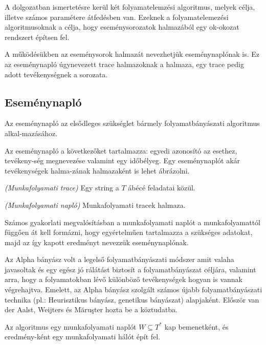 

A dolgozatban ismertetésre kerül két folyamatelemzési algoritmus, melyek célja, illetve számos paramétere átfedésben van. Ezeknek a folyamatelemezési algoritmusoknak a célja, hogy eseménysorozatok halmazából egy ok-okozat rendszert építsen fel.

A működésükben az eseménysorok halmazát nevezhetjük eseménynaplónak is. Ez az eseménynapló úgynevezett trace halmazoknak a halmaza, egy trace pedig adott tevékenységnek a sorozata.

\subsection{Eseménynapló}
Az eseménynapló az elsődleges szükséglet bármely folyamatbányászati algoritmus alkal\hyp{}mazásához.

Az eseménynapló a következőket tartalmazza: egyedi azonosító az esethez, tevékeny\hyp{}ség megnevezése valamint egy időbélyeg. Egy eseménynaplót akár tevékenységek halma\hyp{}zának halmazaként is lehet ábrázolni.

\begin{definition}{\textit{(Munkafolyamati trace)}} Egy string a $T$ ábécé feladatai közül.\end{definition}
\begin{definition}{\textit{(Munkafolyamati napló)}} Munkafolyamati tracek halmaza.\end{definition}

Számos gyakorlati megvalósításban a munkafolyamati naplót a munkafolyamattól függően át kell formázni, hogy egyértelműen tartalmazza a szükséges adatokat, majd az így kapott eredményt nevezzük eseménynaplónak.


Az Alpha bányász volt a legelső folyamatbányászati módszer amit valaha javasoltak és egy egész jó rálátást biztosít a folyamatbányászat céljára, valamint arra, hogy a folyamatokban lévő különböző tevékenységek hogyan is vannak végrehajtva. Emelett, az Alpha bányász szolgált számos újabb folyamatbányászati technika (pl.: Heurisztikus bányász, genetikus bányászat) alapjaként. Először van der Aalst, Weijters és Măruşter hozta be a köztudatba. 

Az algoritmus egy munkafolyamati naplót $W \subseteq  T^*$ kap bemenetként, és eredmény\hyp{}ként egy munkafolyamati hálót épít fel.

